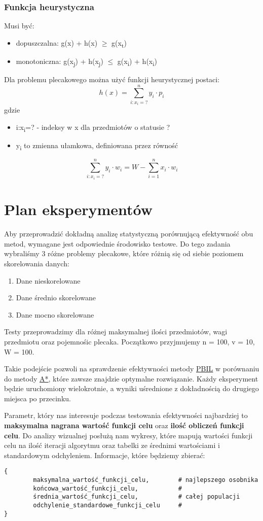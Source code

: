 \documentclass[11pt]{article}
\begin{document}
\subsubsection{Funkcja heurystyczna}
\label{sec:org8963b0e}
Musi być:
\begin{itemize}
\item dopuszczalna: g(x) + h(x) \(\ge\) g(x\textsubscript{t})
\item monotoniczna: g(x\textsubscript{j}) + h(x\textsubscript{j}) \(\le\) g(x\textsubscript{i}) + h(x\textsubscript{i})
\end{itemize}
Dla problemu plecakowego można użyć funkcji heurystycznej postaci:
\[
        h(x) = \sum_{i:x_i=?}^n{y_i \cdot p_i}
\]
gdzie
\begin{itemize}
\item i:x\textsubscript{i}=? - indeksy w x dla przedmiotów o statusie ?
\item y\textsubscript{i} to zmienna ułamkowa, definiowana przez równość
\end{itemize}
\[
        \sum_{i:x_i=?}^n{y_i \cdot w_i} = W - \sum_{i=1}^n{x_i \cdot w_i}
\]
\section{Plan eksperymentów}
\label{sec:org78ee836}
Aby przeprowadzić dokładną analizę statystyczną porównującą efektywność obu metod, wymagane jest odpowiednie środowisko testowe. Do tego zadania wybraliśmy 3 różne problemy plecakowe, które różnią się od siebie poziomem skorelowania danych:
\begin{enumerate}
\item Dane nieskorelowane
\item Dane średnio skorelowane
\item Dane mocno skorelowane
\end{enumerate}
Testy przeprowadzimy dla różnej maksymalnej ilości przedmiotów, wagi przedmiotu oraz pojemnośic plecaka. Początkowo przyjmujemy n = 100, v = 10, W = 100.

Takie podejście pozwoli na sprawdzenie efektywności metody \uline{\hyperref[sec:org5c31017]{PBIL}} w porównaniu do metody \hyperref[sec:orgd1b064a]{\uline{A*}}, które zawsze znajdzie optymalne rozwiązanie. Każdy eksperyment będzie uruchomiony wielokrotnie, a wyniki uśrednione z dokładnością do drugiego miejsca po przecinku.

Parametr, który nas interesuje podczas testowania efektywności najbardziej to \textbf{maksymalna nagrana wartość funkcji celu} oraz \textbf{ilość obliczeń funkcji celu}. Do analizy wizualnej posłużą nam wykresy, które mapują wartości funkcji celu na ilość iteracji algorytmu oraz tabelki ze średnimi wartościami i standardowym odchyleniem. Informacje, które będziemy zbierać:
\begin{verbatim}
{
        maksymalna_wartość_funkcji_celu,        # najlepszego osobnika
        końcowa_wartość_funkcji_celu,           #
        średnia_wartość_funkcji_celu,           # całej populacji
        odchylenie_standardowe_funkcji_celu     #
}
\end{verbatim}
\end{document}
